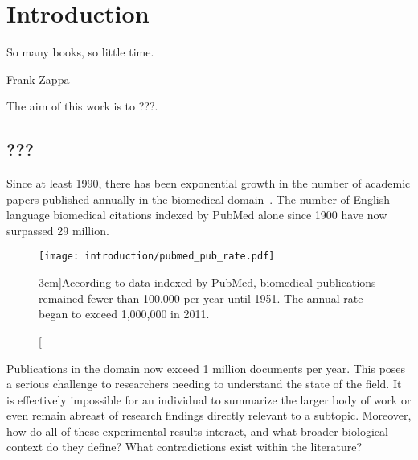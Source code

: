 \chapter{Introduction}
\label{chapter:introduction}
\epigraph{So many books, so little time.}{Frank Zappa}

The aim of this work is to ???.

\section{???}
\label{sec:intro-1}
Since at least 1990, there has been exponential growth in the number of academic papers published annually in the biomedical domain~\citep{pautasso2012publication}.  
The number of English language biomedical citations indexed by PubMed alone since 1900 have now surpassed 29 million.

\begin{figure}
  \centering
  \texttt{[image: introduction/pubmed\_pub\_rate.pdf]}
  \caption[][3cm]{According to data indexed by PubMed, biomedical publications remained fewer than 100,000 per year until 1951.  The annual rate began to exceed 1,000,000 in 2011.}
  \label{fig:intro-pubmed-pubs}
\end{figure}

Publications in the domain now exceed 1 million documents per year.  
This poses a serious challenge to researchers needing to understand the state of the field.  
It is effectively impossible for an individual to summarize the larger body of work or even remain abreast of research findings directly relevant to a subtopic.  %
Moreover, how do all of these experimental results interact, and what broader biological context do they define?  
What contradictions exist within the literature?